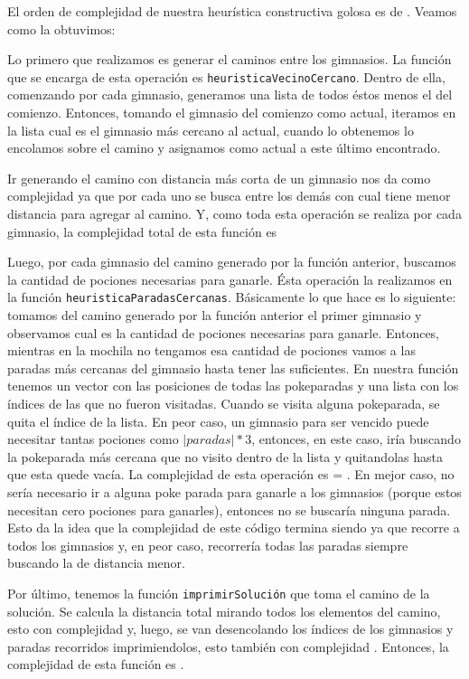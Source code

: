 El orden de complejidad de nuestra heurística constructiva golosa es de . Veamos como la obtuvimos:

Lo primero que realizamos es generar el caminos entre los gimnasios. La función que se encarga de esta operación es \texttt{heuristicaVecinoCercano}. Dentro de ella, comenzando por cada gimnasio, generamos una lista de todos éstos menos el del comienzo. Entonces, tomando el gimnasio del comienzo como actual, iteramos en la lista cual es el gimnasio más cercano al actual, cuando lo obtenemos lo encolamos sobre el camino y asignamos como actual a este último encontrado.

Ir generando el camino con distancia más corta de un gimnasio nos da como complejidad  ya que por cada uno se busca entre los demás con cual tiene menor distancia para agregar al camino. Y, como toda esta operación se realiza por cada gimnasio, la complejidad total de esta función es 

Luego, por cada gimnasio del camino generado por la función anterior, buscamos la cantidad de pociones necesarias para ganarle. Ésta operación la realizamos en la función \texttt{heuristicaParadasCercanas}. Básicamente lo que hace es lo siguiente: tomamos del camino generado por la función anterior el primer gimnasio y observamos cual es la cantidad de pociones necesarias para ganarle. Entonces, mientras en la mochila no tengamos esa cantidad de pociones vamos a las paradas más cercanas del gimnasio hasta tener las suficientes. En nuestra función tenemos un vector con las posiciones de todas las pokeparadas y una lista con los índices de las que no fueron visitadas. Cuando se visita alguna pokeparada, se quita el índice de la lista. En peor caso, un gimnasio para ser vencido puede necesitar tantas pociones como $|paradas|*3$, entonces, en este caso, iría buscando la pokeparada más cercana que no visito dentro de la lista y quitandolas hasta que esta quede vacía. La complejidad de esta operación es  = . En mejor caso, no sería necesario ir a alguna poke parada para ganarle a los gimnasios (porque estos necesitan cero pociones para ganarles), entonces no se buscaría ninguna parada. 
Esto da la idea que la complejidad de este código termina siendo  ya que recorre a todos los gimnasios y, en peor caso, recorrería todas las paradas siempre buscando la de distancia menor.

Por último, tenemos la función \texttt{imprimirSoluci\'on} que toma el camino de la solución. Se calcula la distancia total mirando todos los elementos del camino, esto con complejidad  y, luego, se van desencolando los índices de los gimnasios y paradas recorridos imprimiendolos, esto también con complejidad . Entonces, la complejidad de esta función es .


